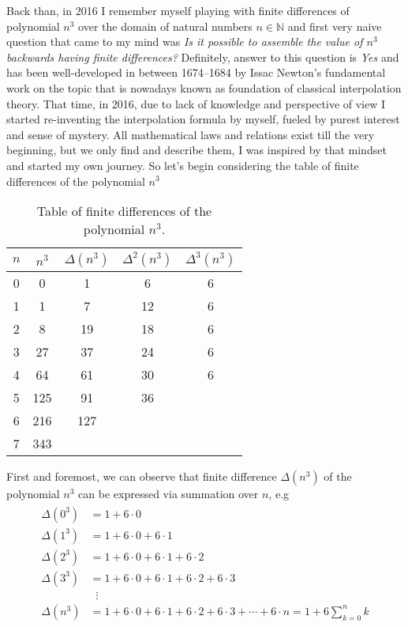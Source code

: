 Back than, in 2016 I remember myself playing with finite differences of polynomial $n^3$ over the domain of natural
numbers $n\in\mathbb{N}$ and first very naive question that came to my mind was \textit{Is it possible to assemble the value of
    $n^3$ backwards having finite differences?}
Definitely, answer to this question is \textit{Yes} and has been well-developed in between 1674--1684
by Issac Newton's fundamental work on the topic that is nowadays known as foundation of classical interpolation theory.
That time, in 2016, due to lack of knowledge and perspective of view I started re-inventing the interpolation formula by myself,
fueled by purest interest and sense of mystery.
All mathematical laws and relations exist till the very beginning, but we only find and describe them,
I was inspired by that mindset and started my own journey.
So let's begin considering the table of finite differences of the polynomial $n^3$
\begin{table}[H]
    \begin{center}
        \setlength\extrarowheight{-6pt}
        \begin{tabular}{c|cccc}
            $n$ & $n^3$ & $\Delta(n^3)$ & $\Delta^2(n^3)$ & $\Delta^3(n^3)$ \\
            \hline
            0   & 0     & 1             & 6               & 6               \\
            1   & 1     & 7             & 12              & 6               \\
            2   & 8     & 19            & 18              & 6               \\
            3   & 27    & 37            & 24              & 6               \\
            4   & 64    & 61            & 30              & 6               \\
            5   & 125   & 91            & 36              &                 \\
            6   & 216   & 127           &                 &                 \\
            7   & 343   &               &                 &
        \end{tabular}
    \end{center}
    \caption{Table of finite differences of the polynomial $n^3$.} \label{tab:table}
\end{table}
First and foremost, we can observe that finite difference $\Delta(n^3)$ of the polynomial $n^3$
can be expressed via summation over $n$, e.g
\begin{align}
    \label{eq:cubes_interpolation}
    \begin{split}
        \Delta(0^3) &= 1+6 \cdot 0 \\
        \Delta(1^3) &= 1+6\cdot0+6\cdot1 \\
        \Delta(2^3) &= 1+6\cdot0+6\cdot1+6\cdot2 \\
        \Delta(3^3) &= 1+6\cdot0+6\cdot1+6\cdot2+6\cdot3 \\
        &\; \; \vdots \\
        \Delta(n^3) &= 1+6\cdot0+6\cdot1+6\cdot2+6\cdot3+\cdots+6\cdot n = 1 + 6 \sum_{k=0}^{n} k
    \end{split}
\end{align}
